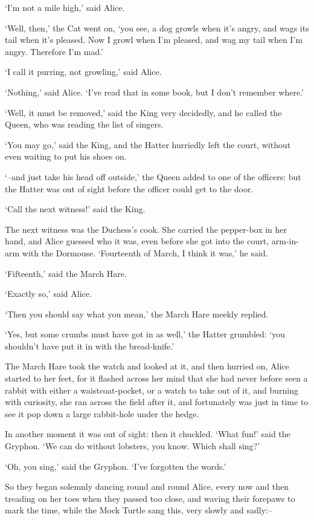 \documentclass[statementpaper,twoside,openany]{memoir}
\begin{document}
`I'm not a mile high,' said Alice.

`Well, then,' the Cat went on, `you see, a dog growls when it's angry, and wags its tail when it's pleased. Now I growl when I'm pleased, and wag my tail when I'm angry. Therefore I'm mad.'

`I call it purring, not growling,' said Alice.

`Nothing,' said Alice. `I've read that in some book, but I don't remember where.'

`Well, it must be removed,' said the King very decidedly, and he called the Queen, who was reading the list of singers.

`You may go,' said the King, and the Hatter hurriedly left the court, without even waiting to put his shoes on.

`--and just take his head off outside,' the Queen added to one of the officers: but the Hatter was out of sight before the officer could get to the door.

`Call the next witness!' said the King.

The next witness was the Duchess's cook. She carried the pepper-box in her hand, and Alice guessed who it was, even before she got into the court, arm-in-arm with the Dormouse. `Fourteenth of March, I think it was,' he said.

`Fifteenth,' said the March Hare.

`Exactly so,' said Alice.

`Then you should say what you mean,' the March Hare meekly replied.

`Yes, but some crumbs must have got in as well,' the Hatter grumbled: `you shouldn't have put it in with the bread-knife.'

The March Hare took the watch and looked at it, and then hurried on, Alice started to her feet, for it flashed across her mind that she had never before seen a rabbit with either a waistcoat-pocket, or a watch to take out of it, and burning with curiosity, she ran across the field after it, and fortunately was just in time to see it pop down a large rabbit-hole under the hedge.

In another moment it was out of sight: then it chuckled. `What fun!' said the Gryphon. `We can do without lobsters, you know. Which shall sing?'

`Oh, you sing,' said the Gryphon. `I've forgotten the words.'

So they began solemnly dancing round and round Alice, every now and then treading on her toes when they passed too close, and waving their forepaws to mark the time, while the Mock Turtle sang this, very slowly and sadly:--
\end{document}

